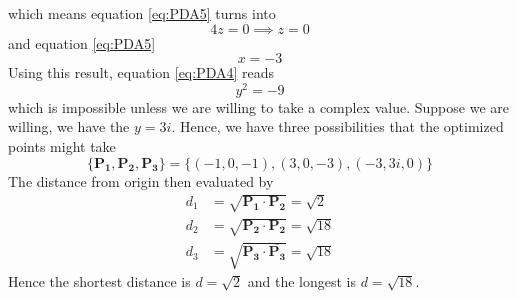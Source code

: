 \documentclass[../../Main.tex]{subfiles}
\begin{document}
which means equation \ref{eq:PDA5} turns into
\begin{equation*}
    4z=0 \implies z=0
\end{equation*}
and equation \ref{eq:PDA5}
\begin{equation*}
    x=-3
\end{equation*}
Using this result, equation \ref{eq:PDA4} reads 
\begin{equation*}
    y^2=-9
\end{equation*}
which is impossible unless we are willing to take a complex value. Suppose we are willing, we have the $y=3i$. Hence, we have three possibilities that the optimized points might take
\begin{equation*}
    \{\mathbf{P_1},\mathbf{P_2},\mathbf{P_3}\}=\{(-1,0,-1),(3,0,-3),(-3,3i,0)\}
\end{equation*}
The distance from origin then evaluated by 
\begin{align*}
    d_1&=\sqrt{\mathbf{P_1}\cdot\mathbf{P_2}}=\sqrt{2}\\
    d_2&=\sqrt{\mathbf{P_2}\cdot\mathbf{P_2}}=\sqrt{18}\\
    d_3&=\sqrt{\mathbf{P_3}\cdot\mathbf{\overline{P_3}}}=\sqrt{18}
\end{align*}
Hence the shortest distance is $d=\sqrt{2}$ and the longest is $d=\sqrt{18}$.
\end{document}
